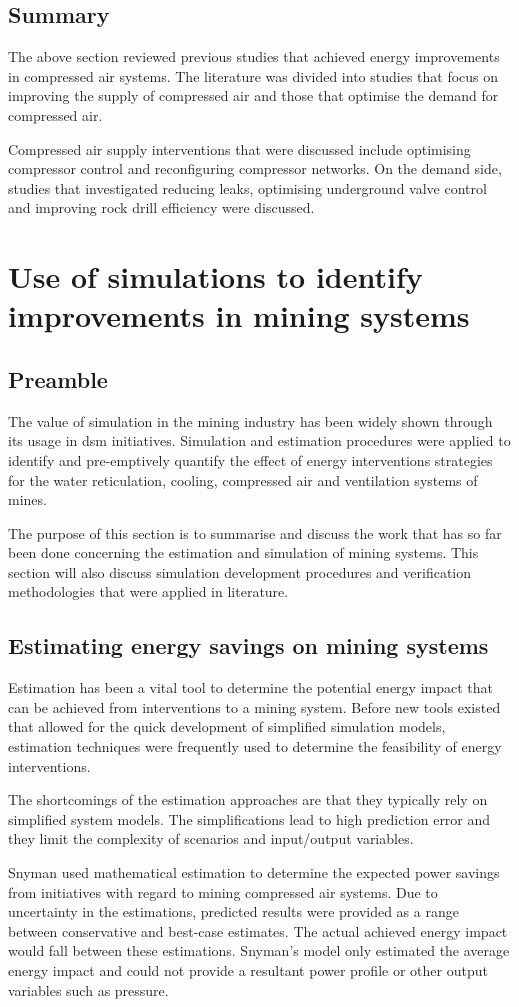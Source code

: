 	\subsection{Summary}
	The above section reviewed previous studies that achieved energy improvements in compressed air systems. The literature was divided into studies that focus on improving the supply of compressed air and those that optimise the demand for compressed air.
	\par
	Compressed air supply interventions that were discussed include optimising compressor control and reconfiguring compressor networks. On the demand side, studies that investigated reducing leaks, optimising underground valve control and improving rock drill efficiency were discussed.
\section{Use of simulations to identify improvements in mining systems}
	\subsection{Preamble}
	The value of simulation in the mining industry has been widely shown through its usage in \gls{dsm} initiatives. Simulation and estimation procedures were applied to identify and pre-emptively quantify the effect of energy interventions strategies for the water reticulation, cooling, compressed air and ventilation systems of mines.
	\par
	 The purpose of this section is to summarise and discuss the work that has so far been done concerning the estimation and simulation of mining systems. This section will also discuss simulation development procedures and verification methodologies that were applied in literature.
	
	\subsection{Estimating energy savings on mining systems }
	Estimation has been a vital tool to determine the potential energy impact that can be achieved from interventions to a mining system. Before new tools existed that allowed for the quick development of simplified simulation models, estimation techniques were frequently used to determine the feasibility of energy interventions. 
	\clearpage
	\par 
	The shortcomings of the estimation approaches are that they typically rely on simplified system models. The simplifications lead to high prediction error and they limit the complexity of scenarios and input/output variables.
		\par 
	Snyman \cite{Snyman2011Masters} used mathematical estimation to determine the expected power savings from initiatives with regard to mining compressed air systems. Due to uncertainty in the estimations, \cite{Snyman2011Masters} predicted results were provided as a range between conservative and best-case estimates. The actual achieved energy impact would fall between these estimations. Snyman's model only estimated the average energy impact and could not provide a resultant power profile or other output variables such as pressure.
		 	
